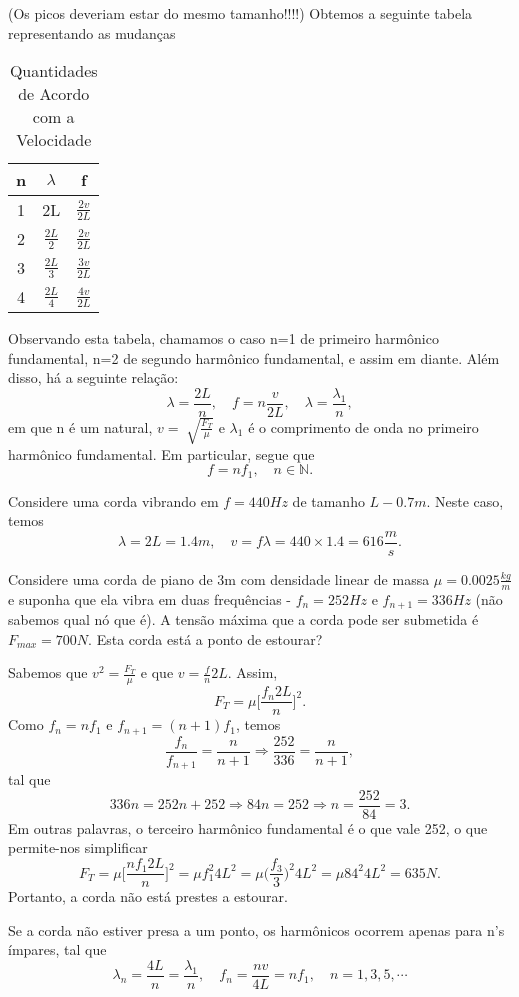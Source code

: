 \documentclass[PhysicsII/physicsII_notes.tex]{subfiles}
\begin{document}
(Os picos deveriam estar do mesmo tamanho!!!!)
Obtemos a seguinte tabela representando as mudanças
\begin{center}
	\begin{table}[h!]
		\caption{Quantidades de Acordo com a Velocidade}
		\centering
		\begin{tabular}{| c | c | c |}
			\hline
			n & \(\lambda \)     & f                 \\
			\hline
			1 & 2L               & \(\frac{2v}{2L}\) \\
			2 & \(\frac{2L}{2}\) & \(\frac{2v}{2L}\) \\
			3 & \(\frac{2L}{3}\) & \(\frac{3v}{2L}\) \\
			4 & \(\frac{2L}{4}\) & \(\frac{4v}{2L}\) \\
			\hline
		\end{tabular}
	\end{table}
\end{center}
Observando esta tabela, chamamos o caso n=1 de primeiro harmônico fundamental, n=2 de segundo harmônico fundamental, e assim em diante. Além disso, há a seguinte relação:
\[
	\lambda = \frac{2L}{n},\quad f = n \frac{v}{2L},\quad \lambda = \frac{\lambda_{1}}{n},
\]
em que n é um natural, \(v = \sqrt[]{\frac{F_{T}}{\mu}}\) e \(\lambda_{1}\) é o comprimento de onda no primeiro harmônico fundamental. Em particular, segue que
\[
	f = n f_{1},\quad n\in \mathbb{N}.
\]
\begin{example}
	Considere uma corda vibrando em \(f = 440Hz\) de tamanho \(L - 0.7m\). Neste caso, temos
	\[
		\lambda  = 2L = 1.4m,\quad v = f\lambda = 440\times 1.4 = 616\frac{m}{s}.
	\]
\end{example}
\begin{example}
	Considere uma corda de piano de 3m com densidade linear de massa \(\mu = 0.0025 \frac{kg}{m}\) e suponha que ela vibra em duas frequências - \(f_{n} = 252Hz\) e \(f_{n+1} = 336Hz\)
	(não sabemos qual nó que é). A tensão máxima que a corda pode ser submetida é \(F_{max} = 700N.\) Esta corda está a ponto de estourar?

	Sabemos que \(v^{2} = \frac{F_{T}}{\mu}\) e que \(v = \frac{f}{n}2L\). Assim,
	\[
		F_{T} = \mu \biggl[\frac{f_{n}2L}{n}\biggr]^{2}.
	\]
	Como \(f_{n} = nf_{1}\) e \(f_{n+1} = (n+1)f_{1}\), temos
	\[
		\frac{f_{n}}{f_{n+1}} = \frac{n}{n+1} \Rightarrow \frac{252}{336} = \frac{n}{n+1},
	\]
	tal que
	\[
		336n = 252n + 252 \Rightarrow 84n = 252 \Rightarrow n = \frac{252}{84} = 3.
	\]
	Em outras palavras, o terceiro harmônico fundamental é o que vale 252, o que permite-nos simplificar
	\[
		F_{T} = \mu \biggl[\frac{nf_{1}2L}{n}\biggr]^{2} = \mu f_{1}^{2}4L^{2} = \mu \biggl(\frac{f_{3}}{3}\biggr)^{2}4L^{2} = \mu 84^{2}4L^{2} = 635N.
	\]
	Portanto, a corda não está prestes a estourar.
\end{example}
Se a corda não estiver presa a um ponto, os harmônicos ocorrem apenas para n's ímpares, tal que
\[
	\lambda_{n} = \frac{4L}{n} = \frac{\lambda_{1}}{n},\quad f_{n} = \frac{nv}{4L} = nf_{1},\quad n = 1, 3, 5, \cdots
\]
\end{document}
